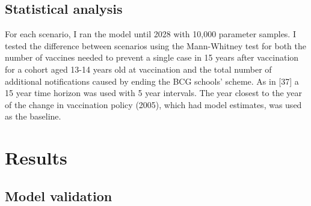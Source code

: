 \documentclass[11pt,twoside]{bristolthesis}
\begin{document}
  \hypertarget{statistical-analysis}{%
  \subsection{Statistical analysis}\label{statistical-analysis}}
  
  For each scenario, I ran the model until 2028 with 10,000 parameter samples. I tested the difference between scenarios using the Mann-Whitney test for both the number of vaccines needed to prevent a single case in 15 years after vaccination for a cohort aged 13-14 years old at vaccination and the total number of additional notifications caused by ending the BCG schools' scheme. As in {[}37{]} a 15 year time horizon was used with 5 year intervals. The year closest to the year of the change in vaccination policy (2005), which had model estimates, was used as the baseline.
  
  \hypertarget{results}{%
  \section{Results}\label{results}}
  
  \hypertarget{model-validation}{%
  \subsection{Model validation}\label{model-validation}}
  
\end{document}

